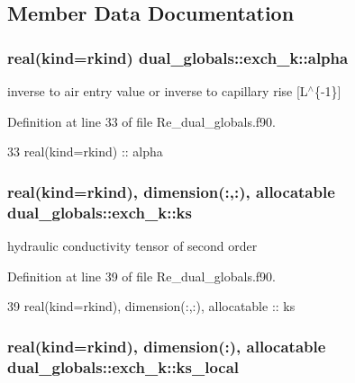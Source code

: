 \subsection{Member Data Documentation}
\subsubsection[{alpha}]{\setlength{\rightskip}{0pt plus 5cm}real(kind=rkind) dual\+\_\+globals\+::exch\+\_\+k\+::alpha}\label{structdual__globals_1_1exch__k_a93ac8511cdcb39facbda099361b9b814}


inverse to air entry value or inverse to capillary rise [L$^\wedge$\{-\/1\}] 



Definition at line 33 of file Re\+\_\+dual\+\_\+globals.\+f90.


\begin{DoxyCode}
33     \textcolor{keywordtype}{real(kind=rkind)} :: alpha
\end{DoxyCode}
\subsubsection[{ks}]{\setlength{\rightskip}{0pt plus 5cm}real(kind=rkind), dimension(\+:,\+:), allocatable dual\+\_\+globals\+::exch\+\_\+k\+::ks}\label{structdual__globals_1_1exch__k_a6588da44ed6d780160ad16cdc717704d}


hydraulic conductivity tensor of second order 



Definition at line 39 of file Re\+\_\+dual\+\_\+globals.\+f90.


\begin{DoxyCode}
39     \textcolor{keywordtype}{real(kind=rkind)}, \textcolor{keywordtype}{dimension(:,:)}, \textcolor{keywordtype}{allocatable} :: ks
\end{DoxyCode}
\subsubsection[{ks\+\_\+local}]{\setlength{\rightskip}{0pt plus 5cm}real(kind=rkind), dimension(\+:), allocatable dual\+\_\+globals\+::exch\+\_\+k\+::ks\+\_\+local}\label{structdual__globals_1_1exch__k_a816b66749c3ed8a24823aa5d12797185}


